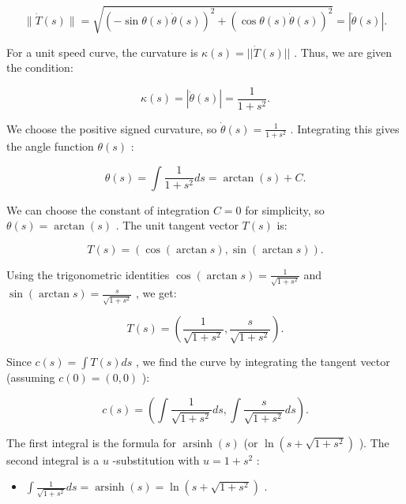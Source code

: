 \documentclass[10pt]{article}
\begin{document}
\[
\parallel \dot{T}\left( s\right) \parallel  = \sqrt{{\left( -\sin \theta \left( s\right) \dot{\theta }\left( s\right) \right) }^{2} + {\left( \cos \theta \left( s\right) \dot{\theta }\left( s\right) \right) }^{2}} = \left| {\dot{\theta }\left( s\right) }\right| .
\]

For a unit speed curve, the curvature is \(\kappa \left( s\right)  = \left| \right| \dot{T}\left( s\right) \left| \right|\) . Thus, we are given the condition:

\[
\kappa \left( s\right)  = \left| {\dot{\theta }\left( s\right) }\right|  = \frac{1}{1 + {s}^{2}}.
\]

We choose the positive signed curvature, so \(\dot{\theta }\left( s\right)  = \frac{1}{1 + {s}^{2}}\) . Integrating this gives the angle function \(\theta \left( s\right)\) :

\[
\theta \left( s\right)  = \int \frac{1}{1 + {s}^{2}}{ds} = \arctan \left( s\right)  + C.
\]

We can choose the constant of integration \(C = 0\) for simplicity, so \(\theta \left( s\right)  = \arctan \left( s\right)\) . The unit tangent vector \(T\left( s\right)\) is:

\[
T\left( s\right)  = \left( {\cos \left( {\arctan s}\right) ,\sin \left( {\arctan s}\right) }\right) .
\]

Using the trigonometric identities \(\cos \left( {\arctan s}\right)  = \frac{1}{\sqrt{1 + {s}^{2}}}\) and \(\sin \left( {\arctan s}\right)  = \frac{s}{\sqrt{1 + {s}^{2}}}\) , we get:

\[
T\left( s\right)  = \left( {\frac{1}{\sqrt{1 + {s}^{2}}},\frac{s}{\sqrt{1 + {s}^{2}}}}\right) .
\]

Since \(c\left( s\right)  = \int T\left( s\right) {ds}\) , we find the curve by integrating the tangent vector (assuming \(c\left( 0\right)  = \left( {0,0}\right)\) ):

\[
c\left( s\right)  = \left( {\int \frac{1}{\sqrt{1 + {s}^{2}}}{ds},\int \frac{s}{\sqrt{1 + {s}^{2}}}{ds}}\right) .
\]

The first integral is the formula for \(\operatorname{arsinh}\left( s\right)\) (or \(\ln \left( {s + \sqrt{1 + {s}^{2}}}\right)\) ). The second integral is a \(u\) -substitution with \(u = 1 + {s}^{2}\) :

\begin{itemize}\relax
\item\relax \(\int \frac{1}{\sqrt{1 + {s}^{2}}}{ds} = \operatorname{arsinh}\left( s\right)  = \ln \left( {s + \sqrt{1 + {s}^{2}}}\right)\) .
\end{itemize}
\end{document}
